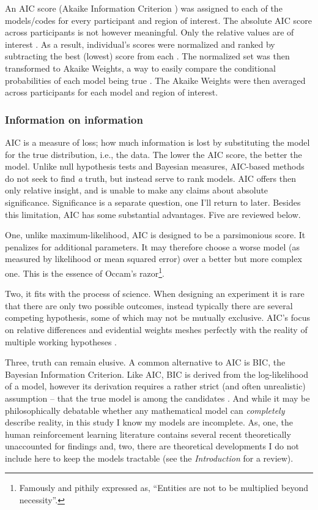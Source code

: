\documentclass[doc,12pt]{apa}        %
\begin{document}
An AIC score (Akaike Information Criterion \cite{Akaike:1974p9530}) was assigned to each of the models/codes for every participant and region of interest.  The absolute AIC score across participants is not however meaningful.  Only the relative values are of interest \cite{Wagenmakers:2004p9472}.  As a result, individual's scores were normalized and ranked by subtracting the best (lowest) score from each \cite{Anderson:2000p9475}. The normalized set was then transformed to Akaike Weights, a way to easily compare the conditional probabilities of each model being true \cite{Wagenmakers:2004p9472}.  The Akaike Weights were then averaged across participants for each model and region of interest.

\subsubsection{Information on information}
\label{subsub:way}
AIC is a measure of loss; how much information is lost by substituting the model for the true distribution, i.e., the data.  The lower the AIC score, the better the model.  Unlike null hypothesis tests and Bayesian measures, AIC-based methods do not seek to find \emph{a} truth, but instead serve to rank models.  AIC offers then only relative insight, and is unable to make any claims about absolute significance.  Significance is a separate question, one I'll return to later.  Besides this limitation, AIC has some substantial advantages. Five are reviewed below.

One, unlike maximum-likelihood, AIC is designed to be a parsimonious score.  It penalizes for additional parameters.  It may therefore choose a worse model (as measured by likelihood or mean squared error) over a better but more complex one. This is the essence of Occam's razor\footnote{Famously and pithily expressed as, ``Entities are not to be multiplied beyond necessity''.}. 

Two, it fits with the process of science.  When designing an experiment it is rare that there are only two possible outcomes, instead typically there are several competing hypothesis, some of which may not be mutually exclusive.  AIC's focus on relative differences and evidential weights meshes perfectly with the reality of multiple working hypotheses \cite{Burnham:2004p9621}.

Three, truth can remain elusive.  A common alternative to AIC is BIC, the Bayesian Information Criterion.  Like AIC, BIC is derived from the log-likelihood of a model, however its derivation requires a rather strict (and often unrealistic) assumption -- that the true model is among the candidates \cite{Forster:2000p9623}.  And while it may be philosophically debatable whether any mathematical model can \emph{completely} describe reality, in this study I know my models are incomplete.  As, one, the human reinforcement learning literature contains several recent theoretically unaccounted for findings and, two, there are theoretical developments I do not include here to keep the models tractable (see the \emph{Introduction} for a review).  
\end{document}
